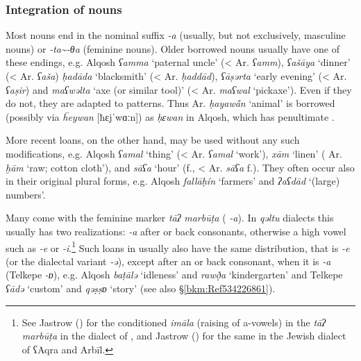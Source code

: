 \documentclass[output=paper]{langsci/langscibook}
\begin{document}
\subsubsection{\label{bkm:Ref13229660}Integration of nouns}


Most  nouns end in the nominal suffix \textit{{}-a} (usually, but not exclusively, masculine nouns) or \textit{{}-ta{\textasciitilde}-θa} (feminine nouns). Older borrowed nouns usually have one of these endings, e.g.  Alqosh \textit{ʕamma} ‘paternal uncle’ (< Ar. \textit{ʕamm}), \textit{ʕašāya} ‘dinner’ (<  Ar. \textit{ʕaša}) \textit{ḥadāda} ‘blacksmith’ (< Ar. \textit{ḥaddād}), \textit{ʕāṣərta} ‘early evening’ (<  Ar. \textit{ʕaṣir}) and \textit{maʕwəlta} ‘axe (or similar tool)’ (<  Ar. \textit{maʕwal} ‘pickaxe’). Even if they do not, they are adapted to   patterns. Thus Ar. \textit{ḥayaw\'{ā}n} ‘animal’ is borrowed (possibly via  \textit{ḧeywan} [ħɛjˈwɑːn]) as \textit{ḥɛwan} in  Alqosh, which has penultimate  \citep[81]{Coghill2004}.

More recent loans, on the other hand, may be used without any such modifications, e.g.  Alqosh \textit{ʕamal} ‘thing’ (< Ar. \textit{ʕamal} ‘work’), \textit{xām} ‘linen’ ( Ar. \textit{ḫām} ‘raw; cotton cloth’), and \textit{sāʕa} ‘hour’ (f., < Ar. \textit{sāʕa} f.). They often occur also in their original  plural forms, e.g.  Alqosh \textit{fallāḥín} ‘farmers’ and \textit{ʔaʕdād} ‘(large) numbers’. 

Many   come with the  feminine marker \textit{tāʔ} \textit{marbūṭa} (  \textit{\nobreakdash-a}). In \textit{qəltu}  dialects this usually has two realizations: \textit{\nobreakdash-a} after  or back consonants, otherwise a high vowel such as \textit{\nobreakdash-e} or \textit{\nobreakdash-i}.\footnote{See Jastrow (\citeyear[40]{Jastrow1979}) for the conditioned \textit{imāla} (raising of a-vowels) in the \textit{tāʔ} \textit{marbūṭa} in the  dialect of , and Jastrow (\citeyear[70]{Jastrow1990book}) for the same in the Jewish  dialect of ʕAqra and Arbīl.} Such loans in  usually also have the same distribution, that is \textit{{}-e} (or the dialectal variant \textit{-ə}), except after an  or back consonant, when it is \textit{\nobreakdash-a} (Telkepe \textit{\nobreakdash-ɒ}), e.g.  Alqosh \textit{baṭālə} ‘idleness’ and \textit{rawð̣a} ‘kindergarten’ and  Telkepe \textit{ʕādə} ‘custom’ and \textit{qəṣṣɒ} ‘story’ (see also §\ref{bkm:Ref534226861}).
\end{document}

